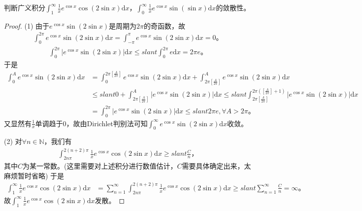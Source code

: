 \documentclass[../../main.tex]{subfiles}
\begin{document}
\begin{example}
判断广义积分\(\int_{1}^{\infty}\frac{1}{x}e^{\cos x}\cos(2\sin x)\mathrm{d}x\)，\(\int_{0}^{\infty}\frac{1}{x}e^{\cos x}\sin(\sin x)\mathrm{d}x\)的敛散性。 
\end{example}
\begin{proof}
(1) 由于\(e^{\cos x}\sin \left( 2\sin x \right)\)是周期为\(2\pi\)的奇函数，故
\begin{align*}
\int_0^{2\pi}{e^{\cos x}\sin \left( 2\sin x \right) \mathrm{d}x}=\int_{-\pi}^{\pi}{e^{\cos x}\sin \left( 2\sin x \right) \mathrm{d}x}=0。
\end{align*}
\begin{align*}
\int_0^{2\pi}{\left| e^{\cos x}\sin \left( 2\sin x \right) \right|\mathrm{d}x}\leqslant slant \int_0^{2\pi}{e\mathrm{d}x}=2\pi e。
\end{align*}
于是
\begin{align*}
\int_0^A{e^{\cos x}\sin \left( 2\sin x \right) \mathrm{d}x}&=\int_0^{2\pi \left[ \frac{A}{2\pi} \right]}{e^{\cos x}\sin \left( 2\sin x \right) \mathrm{d}x}+\int_{2\pi \left[ \frac{A}{2\pi} \right]}^A{e^{\cos x}\sin \left( 2\sin x \right) \mathrm{d}x} \\
&\leqslant slant 0+\int_{2\pi \left[ \frac{A}{2\pi} \right]}^A{\left| e^{\cos x}\sin \left( 2\sin x \right) \right|\mathrm{d}x} 
\leqslant slant \int_{2\pi \left[ \frac{A}{2\pi} \right]}^{2\pi \left( \left[ \frac{A}{2\pi} \right] +1 \right)}{\left| e^{\cos x}\sin \left( 2\sin x \right) \right|\mathrm{d}x} \\
&=\int_0^{2\pi}{\left| e^{\cos x}\sin \left( 2\sin x \right) \right|\mathrm{d}x}\leqslant slant 2\pi e,\forall A>2\pi。
\end{align*}
又显然有\(\frac{1}{x}\)单调趋于\(0\)，故由Dirichlet判别法可知\(\int_0^{\infty}{e^{\cos x}\sin \left( 2\sin x \right) \mathrm{d}x}\)收敛。

(2) 对\(\forall n\in \mathbb{N}\)，我们有
\begin{align*}
\int_{2n\pi}^{2\left( n+2 \right) \pi}{\frac{1}{x}e^{\cos x}\cos \left( 2\sin x \right) \mathrm{d}x}\geqslant slant \frac{C}{n}，
\end{align*}
其中\(C\)为某一常数。(这里需要对上述积分进行数值估计，\(C\)需要具体确定出来，太麻烦暂时省略) 于是
\begin{align*}
\int_1^{\infty}{\frac{1}{x}e^{\cos x}\cos(2\sin x)\mathrm{d}x}&=\sum_{n=1}^{\infty}{\int_{2n\pi}^{2\left( n+2 \right) \pi}{\frac{1}{x}e^{\cos x}\cos \left( 2\sin x \right) \mathrm{d}x}} 
\geqslant slant \sum_{n=1}^{\infty}{\frac{C}{n}}=\infty。
\end{align*}
故\(\int_1^{\infty}{\frac{1}{x}e^{\cos x}\cos(2\sin x)\mathrm{d}x}\)发散。
\end{proof}
\end{document}
